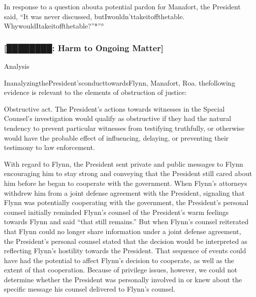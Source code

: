 In response to a question abouta potential pardon for Manafort, the President said, “It was never discussed, butIwouldn'ttakeitoffthetable.
WhywouldItakeitoffthetable?”*”°

\subsubsection{[████████: Harm to Ongoing Matter]}








Analysis

InanalyzingthePresident'sconducttowardsFlynn, Manafort, Roa.
thefollowing evidence is relevant to the elements of obstruction of justice:

Obstructive act.
The President's actions towards witnesses in the Special Counsel's investigation would qualify as obstructive if they had the natural tendency to prevent particular witnesses from testifying truthfully, or otherwise would have the probable effect of influencing, delaying, or preventing their testimony to law enforcement.

With regard to Flynn, the President sent private and public messages to Flynn encouraging him to stay strong and conveying that the President still cared about him before he began to cooperate with the government.
When Flynn's attorneys withdrew him from a joint defense agreement with the President, signaling that Flynn was potentially cooperating with the government, the President's personal counsel initially reminded Flynn's counsel of the President's warm feelings towards Flynn and said “that still remains.”
But when Flynn's counsel reiterated that Flynn could no longer share information under a joint defense agreement, the President's personal counsel stated that the decision would be interpreted as reflecting Flynn's hostility towards the President.
That sequence of events could have had the potential to affect Flynn's decision to cooperate, as well as the extent of that cooperation.
Because of privilege issues, however, we could not determine whether the President was personally involved in or knew about the specific message his counsel delivered to Flynn's counsel.

